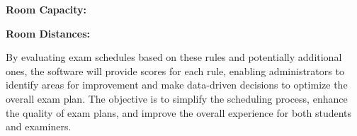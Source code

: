     \textbf{Room Capacity:}\vspace{\baselineskip}
    
    \textbf{Room Distances:} 
\vspace{\baselineskip}
    

By evaluating exam schedules based on these rules and potentially additional ones, the software will provide scores for each rule, enabling administrators to identify areas for improvement and make data-driven decisions to optimize the overall exam plan. The objective is to simplify the scheduling process, enhance the quality of exam plans, and improve the overall experience for both students and examiners.

\vspace{\baselineskip}

